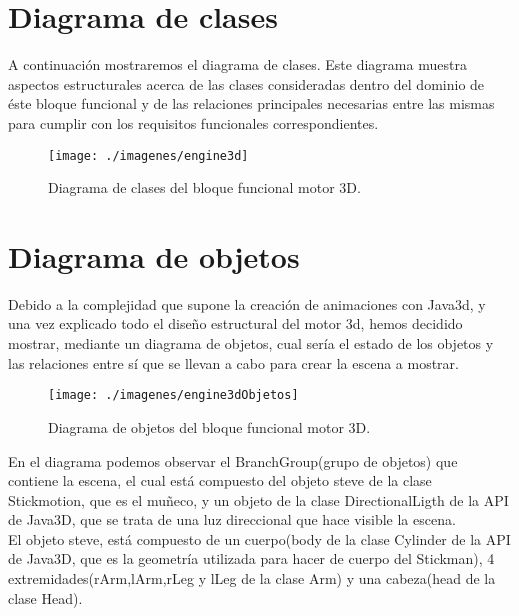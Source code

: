    \section{Diagrama de clases}
   A continuación mostraremos el diagrama de clases. Este diagrama muestra aspectos estructurales acerca de las clases
   consideradas dentro del dominio de éste bloque funcional y de las relaciones principales necesarias entre las mismas 
   para cumplir con los requisitos funcionales correspondientes.
   \begin{figure} [H] \begin{center}
      \texttt{[image: ./imagenes/engine3d]}\label{engine3d}
      \caption{Diagrama de clases del bloque funcional motor 3D.}
   \end{center} \end{figure}


   \section{Diagrama de objetos}
   Debido a la complejidad que supone la creación de animaciones con Java3d, y una vez explicado todo el diseño estructural
   del motor 3d, hemos decidido mostrar, mediante un diagrama de objetos, cual sería el estado de los objetos y las relaciones
   entre sí que se llevan a cabo para crear la escena a mostrar.

   \begin{figure} [H] \begin{center}
      \texttt{[image: ./imagenes/engine3dObjetos]}\label{engine3dObjetos}
      \caption{Diagrama de objetos del bloque funcional motor 3D.}
   \end{center} \end{figure}

   En el diagrama podemos observar el BranchGroup(grupo de objetos) que contiene la escena, el cual está compuesto del objeto 
   steve de la clase Stickmotion, que es el muñeco, y un objeto de la clase DirectionalLigth de la API de Java3D, que se trata
   de una luz direccional que hace visible la escena.\\

   El objeto steve, está compuesto de un cuerpo(body de la clase Cylinder de la API de Java3D, que es la geometría utilizada 
   para hacer de cuerpo del Stickman), 4 extremidades(rArm,lArm,rLeg y lLeg de la clase Arm) y una cabeza(head de la clase Head).\\

